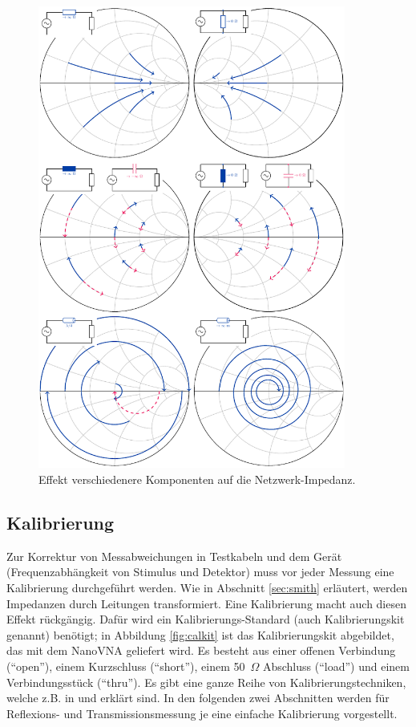 \documentclass[twoside,a4paper,11pt,halfparskip,DIV=11,notitlepage]{scrartcl}
\newcommand{\Ohm}{$\Omega$\xspace}
\begin{document}
\begin{figure}
    \begin{center}\includegraphics[width=0.9\textwidth]{figures/smith_big_picture/smith_big_picture.pdf}\end{center}
    \caption{Effekt verschiedenere Komponenten auf die Netzwerk-Impedanz.}
    \label{fig:smithbigpicture}
\end{figure}
\subsection{Kalibrierung}\label{sec:calibration}

Zur Korrektur von Messabweichungen in Testkabeln und dem Gerät
(Frequenzabhängkeit von Stimulus und Detektor) muss vor jeder Messung eine
Kalibrierung durchgeführt werden. Wie in Abschnitt \ref{sec:smith} erläutert,
werden Impedanzen durch Leitungen transformiert. Eine Kalibrierung macht
auch diesen Effekt rückgängig. Dafür wird ein Kalibrierungs-Standard
(auch Kalibrierungskit genannt) benötigt; in Abbildung \ref{fig:calkit} ist
das Kalibrierungskit abgebildet, das mit dem NanoVNA geliefert wird. Es
besteht aus einer offenen Verbindung (``open''), einem Kurzschluss (``short''),
einem 50~\Ohm Abschluss (``load'') und einem Verbindungsstück (``thru'').
Es gibt eine ganze Reihe von Kalibrierungstechniken, welche z.B. in
\cite{hiebel2007fundamentals}  und \cite{hiebel2008vector} erklärt sind. In
den folgenden zwei Abschnitten werden für Reflexions- und Transmissionsmessung
je eine einfache Kalibrierung vorgestellt.
\end{document}
